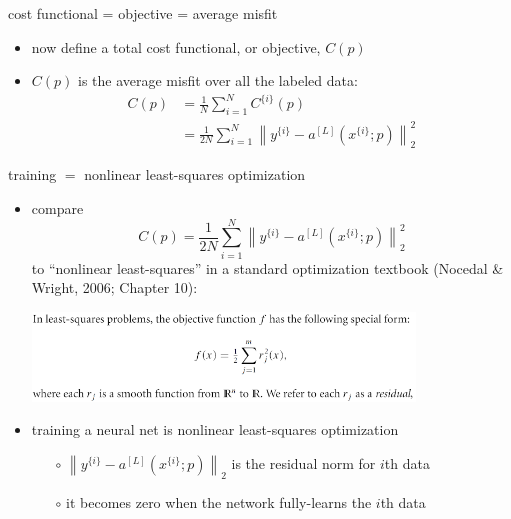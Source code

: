 \documentclass[xcolor={svgnames},
               hyperref={colorlinks,citecolor=DeepPink4,linkcolor=FireBrick,urlcolor=Maroon}]
               {beamer}
\begin{document}
\begin{frame}{cost functional = objective = average misfit}

\begin{itemize}
\item now define a total \alert{cost functional}, or \alert{objective}, $C(p)$
\item $C(p)$ is the \alert{average} misfit over all the labeled data:
\begin{align*}
C(p) &= \frac{1}{N} \sum_{i=1}^N C^{\{i\}}(p) \\
     &= \frac{1}{2N} \sum_{i=1}^N \left\|y^{\{i\}} - a^{[L]}(x^{\{i\}}; p)\right\|_2^2
\end{align*}
\end{itemize}
\end{frame}


\begin{frame}{training $=$ nonlinear least-squares optimization}

\begin{itemize}
\item compare
    $$C(p) = \frac{1}{2N} \sum_{i=1}^N \left\|y^{\{i\}} - a^{[L]}(x^{\{i\}}; p)\right\|_2^2$$
to ``nonlinear least-squares'' in a standard optimization textbook (Nocedal \& Wright, 2006; Chapter 10):

\medskip
\quad \includegraphics[width=0.8\textwidth]{figs/nls}

\medskip
\item training a neural net is \alert{nonlinear least-squares optimization}
    \begin{itemize}
    \item[$\circ$] $\left\|y^{\{i\}} - a^{[L]}(x^{\{i\}}; p)\right\|_2$ is the \alert{residual norm} for $i$th data
    \item[$\circ$] it becomes zero when the network fully-learns the $i$th data
    \end{itemize}
\end{itemize}
\end{frame}
\end{document}
